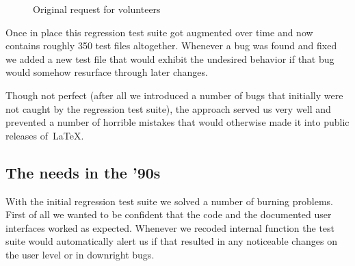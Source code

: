 \documentclass[a4paper]{ltugboat}
\begin{document}
\begin{figure}
\centering
{}
\caption{Original request for volunteers}\label{fig:volunteers}
\end{figure}

Once in place this regression test suite got augmented over time and
now contains roughly 350 test files altogether. Whenever a bug was
found and fixed we added a new test file that would exhibit the undesired behavior
if that bug would somehow resurface through later changes. 

Though not
perfect (after all we introduced a number of bugs that initially were
not caught by the regression test suite), the approach served us very
well and prevented a number of horrible mistakes that would otherwise
made it into public releases of~\LaTeX.

\subsection{The needs in the '90s}

With the initial regression test suite we solved a number of burning
problems. First of all we wanted to be confident that the code and the
documented user interfaces worked as expected. Whenever we recoded
internal function the test suite would automatically alert us if that
resulted in any noticeable changes on the user level or in downright
bugs. 
\end{document}
